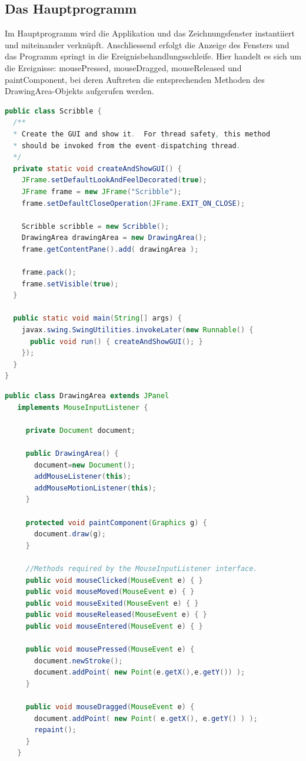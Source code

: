 \subsection{Das Hauptprogramm}
Im Hauptprogramm  wird die Applikation und das Zeichnungsfenster
instantiiert und miteinander verknüpft. Anschliessend erfolgt
die Anzeige des Fensters und das Programm springt in die
 Ereignisbehandlungsschleife. Hier handelt
es sich um die Ereignisse: mousePressed, mouseDragged, mouseReleased und
paintComponent,
bei deren Auftreten die entsprechenden Methoden des DrawingArea-Objekts
aufgerufen werden.
\fi
\newslide
\begin{lstlisting}[language=java]
public class Scribble {
  /**
  * Create the GUI and show it.  For thread safety, this method
  * should be invoked from the event-dispatching thread.
  */
  private static void createAndShowGUI() {
    JFrame.setDefaultLookAndFeelDecorated(true);
    JFrame frame = new JFrame("Scribble");
    frame.setDefaultCloseOperation(JFrame.EXIT_ON_CLOSE);
    
    Scribble scribble = new Scribble();
    DrawingArea drawingArea = new DrawingArea();
    frame.getContentPane().add( drawingArea );
    
    frame.pack();
    frame.setVisible(true);
  }
  
  public static void main(String[] args) {
    javax.swing.SwingUtilities.invokeLater(new Runnable() {
      public void run() { createAndShowGUI(); }
    });
  }
}
\end{lstlisting}
\newpage
\begin{lstlisting}[language=java]
public class DrawingArea extends JPanel
   implements MouseInputListener {
        
     private Document document;

     public DrawingArea() {
       document=new Document();
       addMouseListener(this);
       addMouseMotionListener(this);
     }

     protected void paintComponent(Graphics g) {
       document.draw(g);
     }

     //Methods required by the MouseInputListener interface.
     public void mouseClicked(MouseEvent e) { }
     public void mouseMoved(MouseEvent e) { }
     public void mouseExited(MouseEvent e) { }
     public void mouseReleased(MouseEvent e) { }
     public void mouseEntered(MouseEvent e) { }
     
     public void mousePressed(MouseEvent e) { 
       document.newStroke();
       document.addPoint( new Point(e.getX(),e.getY()) );
     }
     
     public void mouseDragged(MouseEvent e) {
       document.addPoint( new Point( e.getX(), e.getY() ) );
       repaint();
     }
   }
\end{lstlisting}
